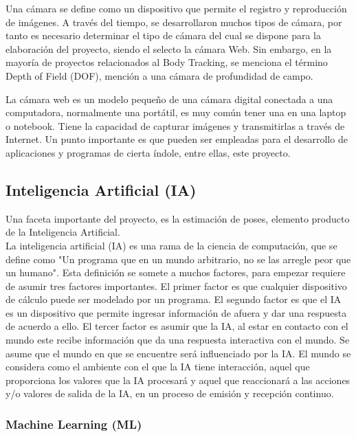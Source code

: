 Una cámara se define como un dispositivo que permite el registro y reproducción de imágenes. A través del tiempo, se desarrollaron muchos tipos de cámara, por tanto es necesario determinar el tipo de cámara del cual se dispone para la elaboración del proyecto, siendo el selecto la cámara Web. Sin embargo, en la mayoría de proyectos relacionados al Body Tracking, se menciona el término Depth of Field (DOF), mención a una cámara de profundidad de campo.

La cámara web es un modelo pequeño de una cámara digital conectada a una computadora, normalmente una portátil, es muy común tener una en una laptop o notebook. Tiene la capacidad de capturar imágenes y transmitirlas a través de Internet. Un punto importante es que pueden ser empleadas para el desarrollo de aplicaciones y programas de cierta índole, entre ellas, este proyecto. 

\subsection{Inteligencia Artificial (IA)}

Una faceta importante del proyecto, es la estimación de poses, elemento producto de la Inteligencia Artificial.
\\
La inteligencia artificial (IA) es una rama de la ciencia de computación, que se define como "Un programa que en un mundo arbitrario, no se las arregle peor que un humano"\cite{dobrev2012definition}. 
Esta definición se somete a muchos factores, para empezar requiere de asumir tres factores importantes.
El primer factor es que cualquier dispositivo de cálculo puede ser modelado por un programa. El segundo factor es que el IA es un dispositivo que permite ingresar información de afuera y dar una respuesta de acuerdo a ello. El tercer factor es asumir que la IA, al estar en contacto con el mundo este recibe información que da una respuesta interactiva con el mundo. Se asume que el mundo en que se encuentre será influenciado por la IA\cite{dobrev2012definition}. El mundo se considera como el ambiente con el que la IA tiene interacción, aquel que proporciona los valores que la IA procesará y aquel que reaccionará a las acciones y/o valores de salida de la IA, en un proceso de emisión y recepción continuo.

\subsubsection{Machine Learning (ML)}

